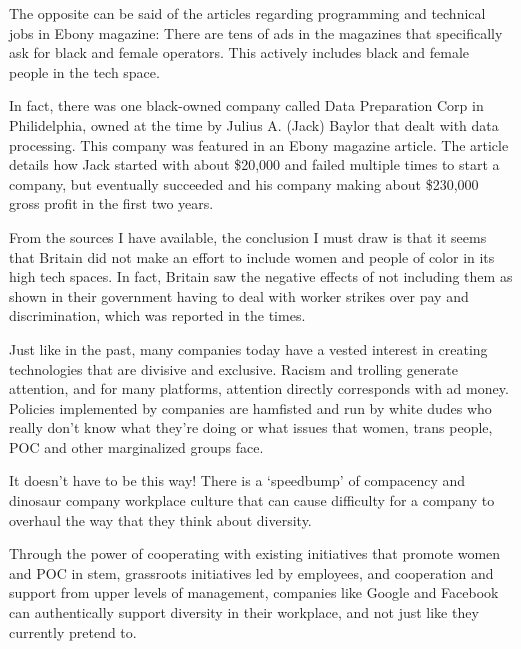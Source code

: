 \documentclass[a4paper,12pt]{article}
\begin{document}
The opposite can be said of the articles regarding programming and technical jobs in Ebony magazine: There are tens of ads in the magazines that specifically ask for black and female operators. This actively includes black and female people in the tech space.

In fact, there was one black-owned company called Data Preparation Corp in Philidelphia, owned at the time by Julius A. (Jack) Baylor that dealt with data processing. This company was featured in an Ebony magazine article. The article details how Jack started with about \$20,000 and failed multiple times to start a company, but eventually succeeded and his company making about \$230,000 gross profit in the first two years.

From the sources I have available, the conclusion I must draw is that it seems that Britain did not make an effort to include women and people of color in its high tech spaces. In fact, Britain saw the negative effects of not including them as shown in their government having to deal with worker strikes over pay and discrimination, which was reported in the times.

Just like in the past, many companies today have a vested interest in creating technologies that are divisive and exclusive. Racism and trolling generate attention, and for many platforms, attention directly corresponds with ad money. Policies implemented by companies are hamfisted and run by white dudes who really don't know what they're doing or what issues that women, trans people, POC and other marginalized groups face.

It doesn't have to be this way! There is a `speedbump' of compacency and dinosaur company workplace culture that can cause difficulty for a company to overhaul the way that they think about diversity.

Through the power of cooperating with existing initiatives that promote women and POC in stem, grassroots initiatives led by employees, and cooperation and support from upper levels of management, companies like Google and Facebook can authentically support diversity in their workplace, and not just like they currently pretend to.

\newpage
\end{document}
